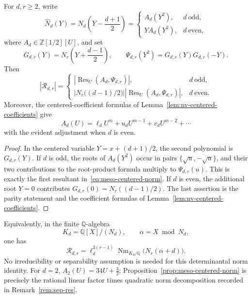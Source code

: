 \begin{proposition}\label{prop:meso-centered-norm}
For $d,r\geq2$, write
\[
 \widehat N_d(Y)=N_d\left(Y-\frac{d+1}{2}\right)
 =\begin{cases}
 A_d(Y^2),&d\ \text{odd},\\
 YA_d(Y^2),&d\ \text{even},
 \end{cases}
\]
where $A_d\in\mathbb Z[1/2][U]$, and set
\[
 G_{d,r}(Y)=N_r\left(Y+\frac{d-1}{2}\right),\qquad
 \Psi_{d,r}(Y^2)=G_{d,r}(Y)G_{d,r}(-Y).
\]
Then
\begin{equation}\label{eq:meso-centered-norm}
 |\mathcal R_{d,r}|=
 \begin{cases}
 |\operatorname {Res}_U(A_d,\Psi_{d,r})|,&d\ \text{odd},\\
 \left|N_r\bigl((d-1)/2\bigr)\right|
 |\operatorname {Res}_U(A_d,\Psi_{d,r})|,&d\ \text{even}.
 \end{cases}
\end{equation}
Moreover, the centered-coefficient formulas of
Lemma~\ref{lem:nv-centered-coefficients} give
\[
 A_d(U)=\ell_dU^m+u_dU^{m-1}+v_dU^{m-2}+\cdots
\]
with the evident adjustment when $d$ is even.
\end{proposition}

\begin{proof}
In the centered variable $Y=x+(d+1)/2$, the second polynomial is
$G_{d,r}(Y)$.  If $d$ is odd, the roots of $A_d(Y^2)$ occur in pairs
$\{\sqrt u,-\sqrt u\}$, and their two contributions to the root-product
formula multiply to $\Psi_{d,r}(u)$.  This is exactly the first
resultant in~\eqref{eq:meso-centered-norm}.  If $d$ is even, the
additional root $Y=0$ contributes $G_{d,r}(0)=N_r((d-1)/2)$.
The last assertion is the parity statement and the coefficient formulas
of Lemma~\ref{lem:nv-centered-coefficients}.
\end{proof}

Equivalently, in the finite $\mathbb Q$-algebra
\[
 K_d=\mathbb Q[X]/(N_d),\qquad \alpha=X\bmod N_d,
\]
one has
\begin{equation}\label{eq:meso-quotient-norm}
 \mathcal R_{d,r}
 =\ell_d^{3(r-1)}
 \operatorname {Nm}_{K_d/\mathbb Q}\bigl(N_r(\alpha+d)\bigr).
\end{equation}
No irreducibility or separability assumption is needed for this
determinantal norm identity.  For $d=2$,
$A_2(U)=34U+\tfrac32$; Proposition~\ref{prop:meso-centered-norm}
is precisely the rational linear factor times quadratic norm decomposition
recorded in Remark~\ref{rem:sep-res}.


